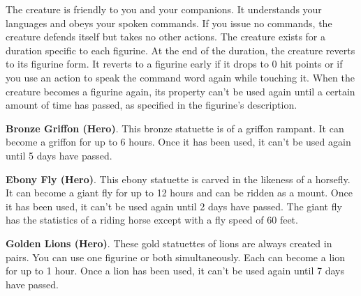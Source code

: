 The creature is friendly to you and your companions. It understands your languages and obeys your spoken commands. If you issue no commands, the creature defends itself but takes no other actions.  The creature exists for a duration specific to each figurine. At the end of the duration, the creature reverts to its figurine form. It reverts to a figurine early if it drops to 0 hit points or if you use an action to speak the command word again while touching it. When the creature becomes a figurine again, its property can't be used again until a certain amount of time has passed, as specified in the figurine's description.

\textbf{Bronze Griffon (Hero)}. This bronze statuette is of a griffon rampant. It can become a griffon for up to 6 hours. Once it has been used, it can't be used again until 5 days have passed.

\textbf{Ebony Fly (Hero)}. This ebony statuette is carved in the likeness of a horsefly. It can become a giant fly for up to 12 hours and can be ridden as a mount. Once it has been used, it can't be used again until 2 days have passed. The giant fly has the statistics of a riding horse except with a fly speed of 60 feet.

\textbf{Golden Lions (Hero)}. These gold statuettes of lions are always created in pairs. You can use one figurine or both simultaneously. Each can become a lion for up to 1 hour. Once a lion has been used, it can't be used again until 7 days have passed.

